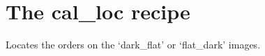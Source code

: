 
\clearpage
\newpage
\section{The cal\_loc recipe}
\label{ch:the_recipes:cal_loc_RAW_spirou}

Locates the orders on the `dark\_flat' or `flat\_dark' images.\\






